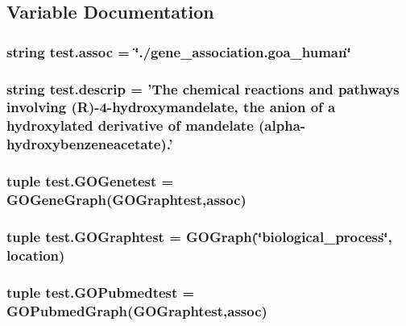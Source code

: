 \subsection{Variable Documentation}
\hypertarget{namespacetest_adb8b1e2a5df72522e42bc012571e75cd}{
\subsubsection[{assoc}]{\setlength{\rightskip}{0pt plus 5cm}string {\bf test.assoc} = \char`\"{}./gene\_\-association.goa\_\-human\char`\"{}}}
\label{namespacetest_adb8b1e2a5df72522e42bc012571e75cd}
\hypertarget{namespacetest_afe7b4432163ad853f4fcd650d0ecab8c}{
\subsubsection[{descrip}]{\setlength{\rightskip}{0pt plus 5cm}string {\bf test.descrip} = 'The chemical reactions and pathways involving (R)-\/4-\/hydroxymandelate, the anion of a hydroxylated derivative of mandelate (alpha-\/hydroxybenzeneacetate).'}}
\label{namespacetest_afe7b4432163ad853f4fcd650d0ecab8c}
\hypertarget{namespacetest_ab48a47ac8dcf21d32cff24c492f085c1}{
\subsubsection[{GOGenetest}]{\setlength{\rightskip}{0pt plus 5cm}tuple {\bf test.GOGenetest} = {\bf GOGeneGraph}({\bf GOGraphtest},{\bf assoc})}}
\label{namespacetest_ab48a47ac8dcf21d32cff24c492f085c1}
\hypertarget{namespacetest_a49256f3800de70e9aabf11ea0c3bb8e1}{
\subsubsection[{GOGraphtest}]{\setlength{\rightskip}{0pt plus 5cm}tuple {\bf test.GOGraphtest} = {\bf GOGraph}(\char`\"{}biological\_\-process\char`\"{}, location)}}
\label{namespacetest_a49256f3800de70e9aabf11ea0c3bb8e1}
\hypertarget{namespacetest_a2565076d50762c7d466830ecbabb1671}{
\subsubsection[{GOPubmedtest}]{\setlength{\rightskip}{0pt plus 5cm}tuple {\bf test.GOPubmedtest} = {\bf GOPubmedGraph}({\bf GOGraphtest},{\bf assoc})}}
